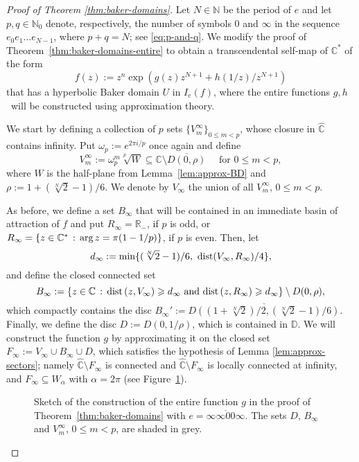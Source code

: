 \documentclass[a4paper, 12pt, reqno]{amsart}
\numberwithin{equation}{section}
\theoremstyle{plain}
\theoremstyle{definition}
\theoremstyle{remark}
\newcommand{\C}{{\mathbb{C}}}
\newcommand{\CR}{{\hat{\mathbb{C}}}}
\newcommand{\R}{{\mathbb{R}}}
\newcommand{\N}{{\mathbb{N}}}
\begin{document}
\begin{proof}[Proof of Theorem \ref{thm:baker-domains}] 
Let $N\in \N$ be the period of $e$ and let $p,q\in\N_0$ denote, respectively, the number of symbols $0$ and $\infty$ in the sequence $e_0e_1\hdots e_{N-1}$, where $p+q=N$; see \eqref{eq:p-and-q}. We modify the proof of Theorem~\ref{thm:baker-domains-entire} to obtain a transcendental self-map of $\C^*$ of the form
$$
f(z):=z^n\exp(g(z)z^{N+1}+h(1/z)/z^{N+1})
$$
that has a hyperbolic Baker domain $U$ in $I_e(f)$, where the entire functions $g, h$~will be constructed using approximation theory. 

We start by defining a collection of $p$ sets $\{V_m^\infty\}_{0\leqslant m<p}$, whose closure in $\CR$ contains infinity. Put $\omega_{p}:=e^{2\pi i/p}$ once again and define
$$
V_{m}^\infty:=\omega_{p}^m\sqrt[p]{W}\subseteq \C\setminus \overline{D(0,\rho)} \quad \mbox{ for } 0\leqslant m<p,
$$
where $W$ is the half-plane from Lemma~\ref{lem:approx-BD} and $\rho:=1+(\sqrt[N]{2}-1)/6$. We denote by $V_\infty$ the union of all $V_m^\infty$, $0\leqslant m<p$.

As before, we define a set $B_\infty$ that will be contained in an immediate basin of attraction of $f$ and put $R_\infty=\R_-$, if $p$ is odd, or $R_\infty=\{z\in\C^*\,:\,\textup{arg}\,z=\pi(1-1/p)\}$, if $p$ is even. Then, let
$$
d_\infty:=\min\{(\sqrt[N]{2}-1)/6,\ \textup{dist}(V_\infty,R_\infty)/4\},
$$
and define the closed connected set
$$
B_\infty:=\{z\in\C\,:\,\textup{dist}\,(z,V_\infty)\geqslant d_\infty \mbox{ and } \textup{dist}\,(z,R_\infty)\geqslant d_\infty\}\setminus D(0,\rho),
$$
which compactly contains the disc $B_\infty':=\overline{D((1+\sqrt[N]{2})/2,(\sqrt[N]{2}-1)/6)}$. Finally, we define the disc $D:=D(0,1/\rho)$, which is contained in $\mathbb D$. We will construct the function $g$ by approximating it on the closed set $F_\infty:=V_\infty\cup B_\infty\cup D$, which satisfies the hypothesis of Lemma \ref{lem:approx-sectors}; namely $\CR\setminus F_\infty$ is connected and $\CR \setminus F_\infty$ is locally connected at infinity, and $F_\infty\subseteq W_\alpha$ with $\alpha=2\pi$ (see Figure~\ref{fig:sketch-bd-cstar-1side}).

\begin{figure}[h!]
\centering
\def\svgwidth{.60\linewidth}

\caption[Sketch of the construction of a transcendental self-map of $\C^*$ that has a cycle of hyperbolic Baker domains I]{Sketch of the construction of the entire function $g$ in the proof of Theorem~\ref{thm:baker-domains} with $e=\overline{\infty\infty00\infty}$. The sets $D$, $B_\infty$ and $V_m^\infty$, \mbox{$0\leqslant m<p$}, are shaded in grey.}
\label{fig:sketch-bd-cstar-1side} 
\end{figure}


\end{proof}
\end{document}
